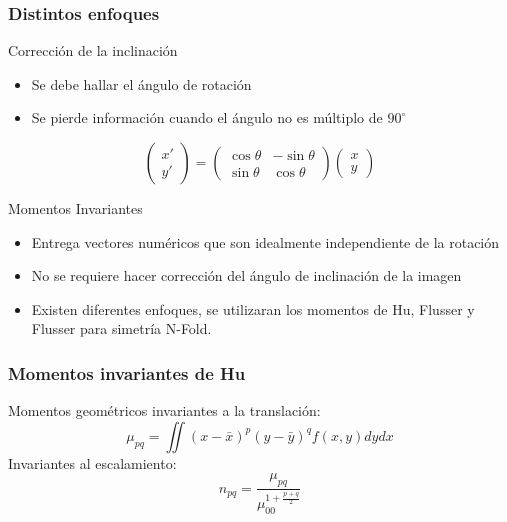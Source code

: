 \documentclass{beamer}
\begin{document}
	\begin{frame}
		\frametitle{Distintos enfoques}
		\begin{block}{Corrección de la inclinación}
		\begin{itemize}
			\item Se debe hallar el ángulo de rotación
			\item Se pierde información cuando el ángulo no es múltiplo de $90^\circ$
		\end{itemize}
		\[
		\begin{pmatrix} 
			x' \\ y'
		\end{pmatrix}
		=
		\begin{pmatrix} 
			\cos\theta & -\sin\theta \\
			\sin\theta & \cos\theta
		\end{pmatrix}
		\begin{pmatrix} 
			x \\ y
		\end{pmatrix}
		\]
		\end{block}
		
		\begin{block}{Momentos Invariantes}
		\begin{itemize}
			\item Entrega vectores numéricos que son idealmente independiente de la rotación
			\item No se requiere hacer corrección del ángulo de inclinación de la imagen
			\item Existen diferentes enfoques, se utilizaran los momentos de Hu, Flusser y Flusser para simetría N-Fold.
		\end{itemize}
		\end{block}
	\end{frame}
	
	\begin{frame}
	\frametitle{Momentos invariantes de Hu}
	Momentos geométricos invariantes a la translación:
	\begin{equation}\label{eq1}
		\mu_{pq} = \iint{ {(x-\bar{x})^p} {(y-\bar{y})^q} f(x,y) dy dx }
	\end{equation}
	Invariantes al escalamiento:
	\begin{equation}\label{eq2}
		n_{pq} = \frac{\mu_{pq}}{ \mu_{00}^{1+\frac{p+q}{2}} }
	\end{equation}
	
	\end{frame}
\end{document}
